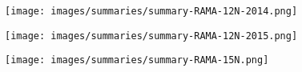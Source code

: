 \begin{landscape}
\begin{center}
\texttt{[image: images/summaries/summary-RAMA-12N-2014.png]}
\end{center}
\end{landscape}

\begin{landscape}
\begin{center}
\texttt{[image: images/summaries/summary-RAMA-12N-2015.png]}
\end{center}
\end{landscape}

\begin{landscape}
\begin{center}
\texttt{[image: images/summaries/summary-RAMA-15N.png]}
\end{center}
\end{landscape}
